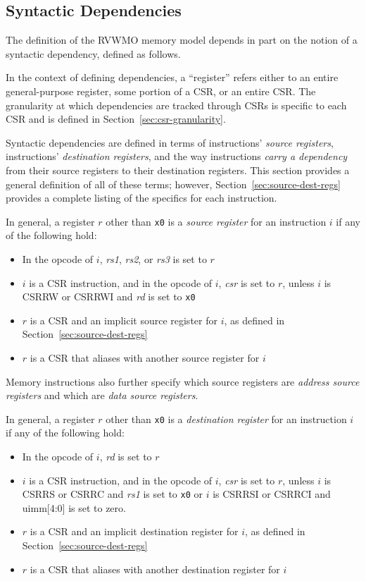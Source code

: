 \subsection*{Syntactic Dependencies}
\label{sec:deps}
The definition of the RVWMO memory model depends in part on the notion of a syntactic dependency, defined as follows.

In the context of defining dependencies, a ``register'' refers either to an entire general-purpose register, some portion of a CSR, or an entire CSR.  The granularity at which dependencies are tracked through CSRs is specific to each CSR and is defined in Section~\ref{sec:csr-granularity}.

Syntactic dependencies are defined in terms of instructions' {\em source registers}, instructions' {\em destination registers}, and the way instructions {\em carry a dependency} from their source registers to their destination registers.
This section provides a general definition of all of these terms; however, Section~\ref{sec:source-dest-regs} provides a complete listing of the specifics for each instruction.

In general, a register $r$ other than {\tt x0} is a {\em source register} for an instruction $i$ if any of the following hold:
\begin{itemize}
  \item In the opcode of $i$, {\em rs1}, {\em rs2}, or {\em rs3} is set to $r$
  \item $i$ is a CSR instruction, and in the opcode of $i$, {\em csr} is set to $r$, unless $i$ is CSRRW or CSRRWI and {\em rd} is set to {\tt x0}
  \item $r$ is a CSR and an implicit source register for $i$, as defined in Section~\ref{sec:source-dest-regs}
  \item $r$ is a CSR that aliases with another source register for $i$
\end{itemize}
Memory instructions also further specify which source registers are {\em address source registers} and which are {\em data source registers}.

In general, a register $r$ other than {\tt x0} is a {\em destination register} for an instruction $i$ if any of the following hold:
\begin{itemize}
  \item In the opcode of $i$, {\em rd} is set to $r$
  \item $i$ is a CSR instruction, and in the opcode of $i$, {\em csr} is set to $r$, unless $i$ is CSRRS or CSRRC and {\em rs1} is set to {\tt x0} or $i$ is CSRRSI or CSRRCI and uimm[4:0] is set to zero.
  \item $r$ is a CSR and an implicit destination register for $i$, as defined in Section~\ref{sec:source-dest-regs}
  \item $r$ is a CSR that aliases with another destination register for $i$
\end{itemize}

